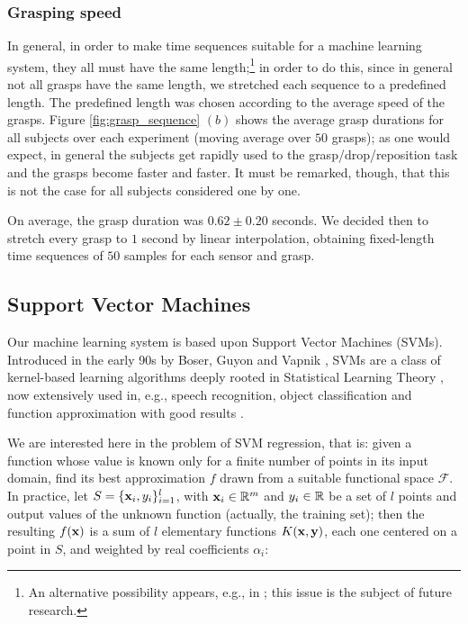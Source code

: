 \subsubsection*{Grasping speed}

In general, in order to make time sequences suitable for a machine
learning system, they all must have the same length;\footnote{An
alternative possibility appears, e.g., in
\cite{shimodaira02dynamic}; this issue is the subject of future
research.} in order to do this, since in general not all grasps have
the same length, we stretched each sequence to a predefined
length. The predefined length was chosen according to the average
speed of the grasps. Figure \ref{fig:grasp_sequence} $(b)$ shows the
average grasp durations for all subjects over each experiment (moving
average over $50$ grasps); as one would expect, in general the
subjects get rapidly used to the grasp/drop/reposition task and the
grasps become faster and faster. It must be remarked, though, that
this is not the case for all subjects considered one by one.

On average, the grasp duration was $0.62 \pm 0.20$ seconds. We decided
then to stretch every grasp to $1$ second by linear interpolation,
obtaining fixed-length time sequences of $50$ samples for each sensor
and grasp.

\subsection{Support Vector Machines}

Our machine learning system is based upon Support Vector Machines
(SVMs). Introduced in the early 90s by Boser, Guyon and Vapnik
\cite{BGV92}, SVMs are a class of kernel-based learning algorithms
deeply rooted in Statistical Learning Theory \cite{v-edbed-82}, now
extensively used in, e.g., speech recognition, object classification
and function approximation with good results \cite{Cristianini00}.

We are interested here in the problem of SVM regression, that is:
given a function whose value is known only for a finite number of
points in its input domain, find its best approximation $f$ drawn from
a suitable functional space $\mathcal{F}$. In practice, let
$S=\{\mathbf{x}_i,y_i\}_{i=1}^l$, with $\mathbf{x}_i \in \mathbb{R}^m$ and $y_i \in \mathbb{R}$ be
a set of $l$ points and output values of the unknown function
(actually, the training set); then the resulting $f(\mathbf{x})$ is a sum of
$l$ elementary functions $K(\mathbf{x},\mathbf{y})$, each one centered on a point in
$S$, and weighted by real coefficients $\alpha_i$:


